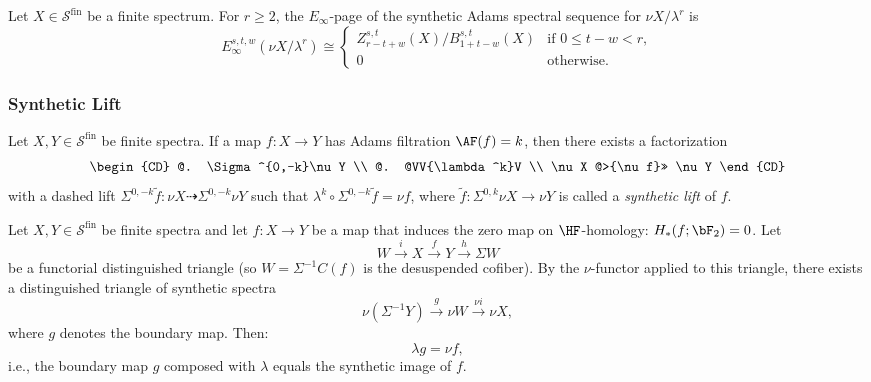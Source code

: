\begin{axiom}\label{prereq:ax:syn-einfty-mod-lambda}
    \leanok
    Let $X \in \mathcal{S}^{\mathrm{fin}}$ be a finite spectrum. For $r \ge 2$, the $E_\infty$-page of the synthetic Adams spectral sequence for $\nu X / \lambda^r$ is
    $$E_\infty^{s,t,w}(\nu X / \lambda^r) \cong \begin{cases}
        Z_{r-t+w}^{s,t}(X) / B_{1+t-w}^{s,t}(X) & \text{if } 0 \le t - w < r, \\
        0 & \text{otherwise}.
    \end{cases}$$
\end{axiom}

\subsubsection{Synthetic Lift}\label{sec:prereq-syn-lift}

\begin{axiom}\label{prereq:ax:synthetic-lift}
    \leanok
    Let $X, Y \in \mathcal{S}^{\mathrm{fin}}$ be finite spectra. If a map $f: X \to Y$ has Adams filtration $\AF(f) = k$, then there exists a factorization
    $$\begin{CD}
    @. \Sigma^{0,-k}\nu Y \\
    @. @VV{\lambda^k}V \\
    \nu X @>{\nu f}>> \nu Y
    \end{CD}$$
    with a dashed lift $\Sigma^{0,-k}\tilde{f}: \nu X \dashrightarrow \Sigma^{0,-k}\nu Y$ such that $\lambda^k \circ \Sigma^{0,-k}\tilde{f} = \nu f$,
    where $\tilde{f}: \Sigma^{0,k}\nu X \to \nu Y$ is called a \emph{synthetic lift} of $f$.
\end{axiom}

\begin{axiom}\label{prereq:ax:lambda-g-equals-f}
    Let $X, Y \in \mathcal{S}^{\mathrm{fin}}$ be finite spectra and let $f: X \to Y$ be a map that induces the zero map on $\HF$-homology: $H_*(f; \bF_2) = 0$. Let
    $$W \xrightarrow{i} X \xrightarrow{f} Y \xrightarrow{h} \Sigma W$$
    be a functorial distinguished triangle (so $W = \Sigma^{-1}C(f)$ is the desuspended cofiber). By the $\nu$-functor applied to this triangle, there exists a distinguished triangle of synthetic spectra
    $$\nu(\Sigma^{-1}Y) \xrightarrow{g} \nu W \xrightarrow{\nu i} \nu X,$$
    where $g$ denotes the boundary map. Then:
    $$\lambda g = \nu f,$$
    i.e., the boundary map $g$ composed with $\lambda$ equals the synthetic image of $f$.
\end{axiom}


